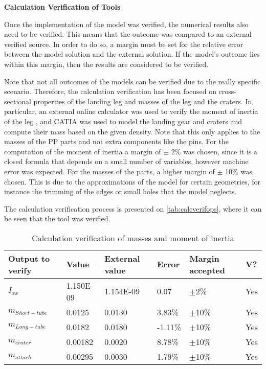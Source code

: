\textbf{Calculation Verification of Tools}

Once the implementation of the model was verified, the numerical results also need to be verified. This means that the outcome was compared to an external verified source. In order to do so, a margin must be set for the relative error between the model solution and the external solution. If the model's outcome lies within this margin, then the results are considered to be verified.

Note that not all outcomes of the models can be verified due to the really specific scenario. Therefore, the calculation verification has been focused on cross-sectional properties of the landing leg and masses of the leg and the craters. In particular, an external online calculator was used to verify the moment of inertia of the leg \cite{Ixxcalc}, and CATIA was used to model the landing gear and craters and compute their mass based on the given density. Note that this only applies to the masses of the PP parts and not extra components like the pins.
For the computation of the moment of inertia a margin of $\pm$ 2\% was chosen, since it is a closed formula that depends on a small number of variables, however machine error was expected. For the masses of the parts, a higher margin of $\pm$ 10\% was chosen. This is due to the approximations of the model for certain geometries, for instance the trimming of the edges or small holes that the model neglects.

The calculation verification process is presented on \autoref{tab:calcverifops}, where it can be seen that the tool was verified.

\begin{table}[h]
\centering
\caption{Calculation verification of masses and moment of inertia}
\label{tab:calcverifops}
\begin{tabular}{|l|l|l|l|l|l|}
\hline
\textbf{Output to verify} & \textbf{Value} & \textbf{External value} & \textbf{Error} & \textbf{Margin accepted} & \textbf{V?} \\ \hline
$I_{xx}$ & 1.150E-09 & 1.154E-09 & 0.07 & $\pm$2\% & \cellcolor[HTML]{C1FFC1}Yes \\ \hline
$m_{Short-tube}$ & 0.0125 & 0.0130 & 3.83\% & $\pm$10\% & \cellcolor[HTML]{C1FFC1}Yes \\ \hline
$m_{Long-tube}$ & 0.0182 & 0.0180 & -1.11\% & $\pm$10\% & \cellcolor[HTML]{C1FFC1}Yes \\ \hline
$m_{crater}$ & 0.00182 & 0.0020 & 8.78\% & $\pm$10\% & \cellcolor[HTML]{C1FFC1}Yes \\ \hline
$m_{attach}$ & 0.00295 & 0.0030 & 1.79\% & $\pm$10\% & \cellcolor[HTML]{C1FFC1}Yes \\ \hline
\end{tabular}%
\end{table}


